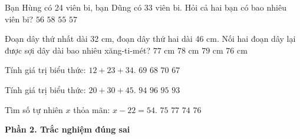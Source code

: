 \begin{ex} %
Bạn Hùng có 24 viên bi, bạn Dũng có 33 viên bi. Hỏi cả hai bạn có bao nhiêu viên bi?
\choice
{$56$}
{$58$}
{$55$}
{\True $57$}
\end{ex}

\begin{ex} %
Đoạn dây thứ nhất dài 32 cm, đoạn dây thứ hai dài 46 cm. Nối hai đoạn dây lại được sợi dây dài bao nhiêu xăng-ti-mét?
\choice
{$77\text{ cm}$}
{\True $78\text{ cm}$}
{$79\text{ cm}$}
{$76\text{ cm}$}
\end{ex}

\begin{ex} %
Tính giá trị biểu thức: $12 + 23 + 34$.
\choice
{\True $69$}
{$68$}
{$70$}
{$67$}
\end{ex}

\begin{ex} %
Tính giá trị biểu thức: $20 + 30 + 45$.
\choice
{$94$}
{$96$}
{\True $95$}
{$93$}
\end{ex}

\begin{ex} %
Tìm số tự nhiên $x$ thỏa mãn: $x - 22 = 54$.
\choice
{$75$}
{$77$}
{$74$}
{\True $76$}
\end{ex}

\textbf{Phần 2. Trắc nghiệm đúng sai}

